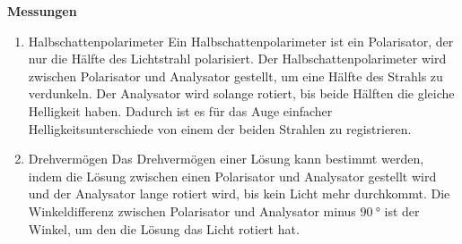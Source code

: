 \textbf{Messungen} 
\begin{enumerate}[label=--]
        \item Halbschattenpolarimeter \hspace{25pt} Ein Halbschattenpolarimeter ist ein Polarisator, der nur die Hälfte des Lichtstrahl polarisiert. 
                Der Halbschattenpolarimeter wird zwischen Polarisator und Analysator gestellt, um eine Hälfte des Strahls zu verdunkeln. 
                Der Analysator wird solange rotiert, bis beide Hälften die gleiche Helligkeit haben.
                Dadurch ist es für das Auge einfacher Helligkeitsunterschiede von einem der beiden Strahlen zu registrieren.
        \item Drehvermögen \hspace{25pt}
                Das Drehvermögen einer Lösung kann bestimmt werden, indem die Lösung zwischen einen Polarisator und Analysator gestellt wird und der Analysator lange rotiert wird, bis kein Licht mehr durchkommt. 
                Die Winkeldifferenz zwischen Polarisator und Analysator minus $\SI{90}{\degree}$ ist der Winkel, um den die Lösung das Licht rotiert hat.
\end{enumerate}

\newpage
